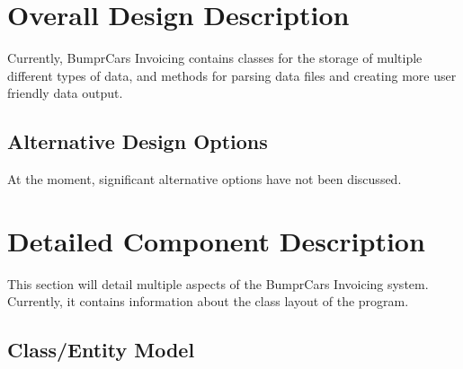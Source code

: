 \documentclass[12pt]{scrartcl} %
\begin{document}
\section{Overall Design Description}
 Currently, BumprCars Invoicing contains classes for the storage of multiple different types of data, and methods for parsing data files and creating more user friendly data output. 
  
\subsection{Alternative Design Options}
At the moment, significant alternative options have not been discussed.

\section{Detailed Component Description}

This section will detail multiple aspects of the BumprCars Invoicing system. Currently, it contains information about the class layout of the program. 





\subsection{Class/Entity Model}
\end{document}
